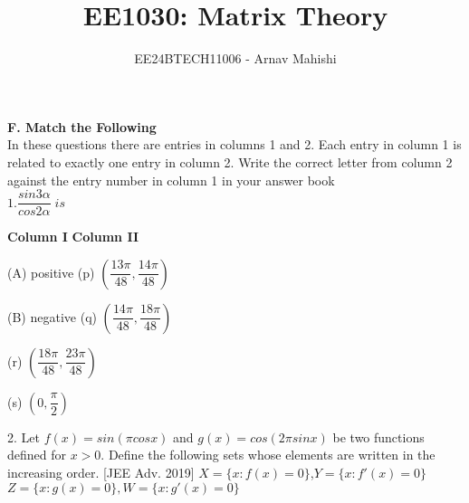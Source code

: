 \documentclass[journal,12pt,twocolumn]{IEEEtran}
\theoremstyle{remark}
\begin{document}

\vspace{3cm}

\title{EE1030: Matrix Theory}
\author{EE24BTECH11006 - Arnav Mahishi}
\maketitle
\newpage
\bigskip

\renewcommand{\thefigure}{\theenumi}
\renewcommand{\thetable}{\theenumi}
\textbf{F. Match the Following} \\
In these questions there are entries in columns 1 and 2. Each entry in column 1 is related to exactly one entry in column 2. Write the correct letter from column 2 against the entry number in column 1 in your answer book
\newline\\
$1. \dfrac{sin3\alpha}{cos2\alpha} \; is $\quad\quad\quad\quad\quad\quad\quad\quad[1992-2 Marks]
\newline

\textbf{Column I}  \hspace{4cm}\textbf{Column II}
\newline

(A) positive \hspace{3cm} (p) $\left(\dfrac{13\pi}{48},\dfrac{14\pi}{48}\right)$
\newline

(B) negative \hspace{3cm} (q) $\left(\dfrac{14\pi}{48},\dfrac{18\pi}{48}\right)$
\newline

\hspace{150pt} (r) $\left(\dfrac{18\pi}{48},\dfrac{23\pi}{48}\right)$
\newline

\hspace{150pt} (s) $\left(0,\dfrac{\pi}{2}\right)$
\newline
\newline

2. Let $f(x)=sin(\pi cosx)$ and $g(x)=cos(2\pi sinx)$ be two functions defined for $x>0$. Define the following sets whose elements are written in the increasing order.\hspace{80pt} [JEE Adv. 2019]
\newline\newline$X=\{x:f(x)=0\}$,$Y=\{x:f'(x)=0\}$\newline
$Z=\{x:g(x)=0\}, W=\{x:g'(x)=0\}$
\newline
\end{document}
